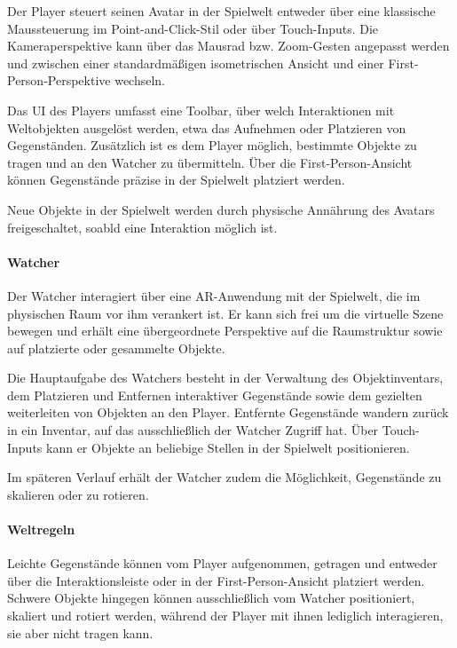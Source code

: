 Der Player steuert seinen Avatar in der Spielwelt entweder über eine klassische Maussteuerung im Point-and-Click-Stil oder über Touch-Inputs. Die Kameraperspektive kann über das Mausrad bzw. Zoom-Gesten angepasst werden und zwischen einer standardmäßigen isometrischen Ansicht und einer First-Person-Perspektive wechseln.

Das \ac{UI} des Players umfasst eine Toolbar, über welch Interaktionen mit Weltobjekten ausgelöst werden, etwa das Aufnehmen oder Platzieren von Gegenständen. Zusätzlich ist es dem Player möglich, bestimmte Objekte zu tragen und an den Watcher zu übermitteln. Über die First-Person-Ansicht können Gegenstände präzise in der Spielwelt platziert werden.

Neue Objekte in der Spielwelt werden durch physische Annährung des Avatars freigeschaltet, soabld eine Interaktion möglich ist.

\paragraph{Watcher}

Der Watcher interagiert über eine \ac{AR}-Anwendung mit der Spielwelt, die im physischen Raum vor ihm verankert ist. Er kann sich frei um die virtuelle Szene bewegen und erhält eine übergeordnete Perspektive auf die Raumstruktur sowie auf platzierte oder gesammelte Objekte.

Die Hauptaufgabe des Watchers besteht in der Verwaltung des Objektinventars, dem Platzieren und Entfernen interaktiver Gegenstände sowie dem gezielten weiterleiten von Objekten an den Player. Entfernte Gegenstände wandern zurück in ein Inventar, auf das ausschließlich der Watcher Zugriff hat. Über Touch-Inputs kann er Objekte an beliebige Stellen in der Spielwelt positionieren.

Im späteren Verlauf erhält der Watcher zudem die Möglichkeit, Gegenstände zu skalieren oder zu rotieren.

\paragraph{Weltregeln}

Leichte Gegenstände können vom Player aufgenommen, getragen und entweder über die Interaktionsleiste oder in der First-Person-Ansicht platziert werden. Schwere Objekte hingegen können ausschließlich vom Watcher positioniert, skaliert und rotiert werden, während der Player mit ihnen lediglich interagieren, sie aber nicht tragen kann. 

